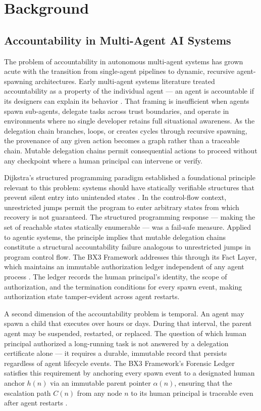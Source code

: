 \section{Background}


\subsection{Accountability in Multi-Agent AI Systems}

The problem of accountability in autonomous multi-agent systems has grown acute with the transition from single-agent pipelines to dynamic, recursive agent-spawning architectures. Early multi-agent systems literature treated accountability as a property of the individual agent --- an agent is accountable if its designers can explain its behavior \cite{wooldridge1995,stone2000}. That framing is insufficient when agents spawn sub-agents, delegate tasks across trust boundaries, and operate in environments where no single developer retains full situational awareness. As the delegation chain branches, loops, or creates cycles through recursive spawning, the provenance of any given action becomes a graph rather than a traceable chain. Mutable delegation chains permit consequential actions to proceed without any checkpoint where a human principal can intervene or verify.

Dijkstra's structured programming paradigm established a foundational principle relevant to this problem: systems should have statically verifiable structures that prevent silent entry into unintended states \cite{dijkstra1982}. In the control-flow context, unrestricted jumps permit the program to enter arbitrary states from which recovery is not guaranteed. The structured programming response --- making the set of reachable states statically enumerable --- was a fail-safe measure. Applied to agentic systems, the principle implies that mutable delegation chains constitute a structural accountability failure analogous to unrestricted jumps in program control flow. The BX3 Framework addresses this through its Fact Layer, which maintains an immutable authorization ledger independent of any agent process \cite{bx3framework2026}. The ledger records the human principal's identity, the scope of authorization, and the termination conditions for every spawn event, making authorization state tamper-evident across agent restarts.

A second dimension of the accountability problem is temporal. An agent may spawn a child that executes over hours or days. During that interval, the parent agent may be suspended, restarted, or replaced. The question of which human principal authorized a long-running task is not answered by a delegation certificate alone --- it requires a durable, immutable record that persists regardless of agent lifecycle events. The BX3 Framework's Forensic Ledger satisfies this requirement by anchoring every spawn event to a designated human anchor $h(n)$ via an immutable parent pointer $\alpha(n)$, ensuring that the escalation path $C(n)$ from any node $n$ to its human principal is traceable even after agent restarts \cite{bx3framework2026}.

